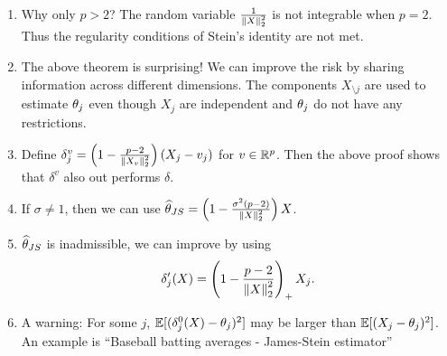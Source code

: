 \begin{remark}
    \begin{enumerate}
        \item Why only $p > 2$? The random variable $\frac{1}{\left\|X\right\|_2^2}$ is not integrable when $p=2$. Thus the regularity conditions of Stein's identity are not met.
        \item The above theorem is surprising! We can improve the risk by sharing information across different dimensions. The components $X_{\setminus j}$ are used to estimate ${\theta}_j$ even though $X_j$ are independent and ${\theta}_j$ do not have any restrictions.
        \item Define $\delta^v_j = \left(1 - \frac{p-2}{\left\|X_v\right\|_2^2}\right)(X_j-v_j)$ for $v\in {\mathbb R}^p$. Then the above proof shows that $\delta^v$ also out performs $\delta$.
        \item If $\sigma \neq 1$, then we can use $\widehat{{\theta}}_{JS} = \left(1-\frac{\sigma^2(p-2)}{\left\|X\right\|_2^2}\right)X$.
        \item $\widehat{{\theta}}_{JS}$ is inadmissible, we can improve by using
        \[\delta_j'(X) = \left(1- \frac{p-2}{\left\|X\right\|_2^2}\right)_+X_j. \]
        \item A warning: For some $j$, ${\mathbb{E}}[(\delta_j^0(X)-{\theta}_j)^2]$ may be larger than ${\mathbb{E}}[(X_j-{\theta}_j)^2]$. An example is ``Baseball batting averages - James-Stein estimator''
    \end{enumerate}
\end{remark}
